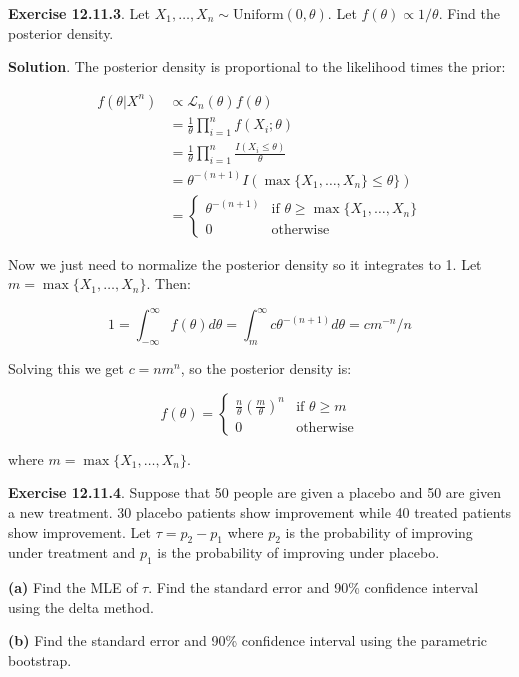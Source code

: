 \textbf{Exercise 12.11.3}. Let
\(X_{1}, \dots, X_{n} \sim \text{Uniform}(0, \theta)\). Let
\(f(\theta) \propto 1/\theta\). Find the posterior density.

\textbf{Solution}. The posterior density is proportional to the
likelihood times the prior:

\begin{align*}
f(\theta | X^{n}) &\propto \mathcal{L}_{n}(\theta) f(\theta) \\
&= \frac{1}{\theta} \prod_{i=1}^{n} f(X_{i}; \theta)  \\
&= \frac{1}{\theta} \prod_{i=1}^{n} \frac{I(X_{i} \leq \theta)}{\theta} \\
&= \theta^{-(n+1)} I( \max \{ X_{1}, \dots, X_{n} \} \leq \theta \} ) \\
&= \begin{cases}
\theta^{-(n+1)} & \text{if } \theta \geq \max \{ X_{1}, \dots, X_{n} \} \\
0 & \text{otherwise}
\end{cases}
\end{align*}

Now we just need to normalize the posterior density so it integrates to
1. Let \(m = \max \{ X_{1}, \dots, X_{n} \}\). Then:

\[ 1 = \int_{-\infty}^{\infty} f(\theta) d\theta  = \int_m^{\infty} c \theta^{-(n+1)} d\theta = c m^{-n} / n\]

Solving this we get \(c = n m^{n}\), so the posterior density is:

\[
f(\theta) = \begin{cases}
\frac{n}{\theta} \left(\frac{m}{\theta}\right)^{n} & \text{if } \theta \geq m \\
0 & \text{otherwise}
\end{cases}
\]

where \(m = \max \{ X_{1}, \dots, X_{n} \}\).

\textbf{Exercise 12.11.4}. Suppose that 50 people are given a placebo
and 50 are given a new treatment. 30 placebo patients show improvement
while 40 treated patients show improvement. Let \(\tau = p_{2} - p_{1}\)
where \(p_{2}\) is the probability of improving under treatment and
\(p_{1}\) is the probability of improving under placebo.

\textbf{(a)} Find the MLE of \(\tau\). Find the standard error and 90\%
confidence interval using the delta method.

\textbf{(b)} Find the standard error and 90\% confidence interval using
the parametric bootstrap.

